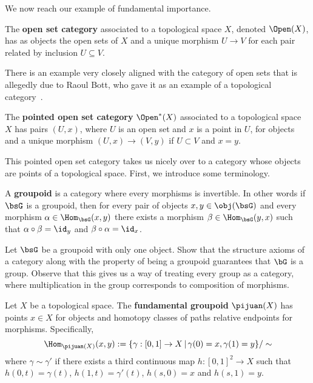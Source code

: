 We now reach our example of fundamental importance.

\begin{ex}
 The \textbf{open set category} associated to a topological space $X$, denoted $\Open(X)$, has as objects the open sets of $X$ and a unique morphism $U\to V$ for each pair related by inclusion $U\subseteq V$.
\end{ex}

 There is an example very closely aligned with the category of open sets that is allegedly due to Raoul Bott, who gave it as an example of a topological category~\cite{bott-mexico,bott-legacy}.

\begin{ex}
The \textbf{pointed open set category} $\Open^*(X)$ associated to a topological space $X$ has pairs $(U,x)$, where $U$ is an open set and $x$ is a point in $U$, for objects and a unique morphism $(U,x)\to (V,y)$ if $U\subset V$ and $x=y$.
\end{ex}

This pointed open set category takes us nicely over to a category whose objects are points of a topological space. First, we introduce some terminology.

\begin{defn}[Groupoid]\label{defn:groupoid}
A \textbf{groupoid} is a category where every morphisms is invertible. In other words if $\bsG$ is a groupoid, then for every pair of objects $x,y\in\obj(\bsG)$ and every morphism $\alpha\in\Hom_{\bsG}(x,y)$ there exists a morphism $\beta\in \Hom_{\bsG}(y,x)$ such that $\alpha\circ\beta=\id_y$ and $\beta\circ\alpha=\id_x$.
\end{defn}

\begin{exr}
Let $\bsG$ be a groupoid with only one object. Show that the structure axioms of a category along with the property of being a groupoid guarantees that $\bG$ is a group. Observe that this gives us a way of treating every group as a category, where multiplication in the group corresponds to composition of morphisms.
\end{exr}

\begin{defn}\label{defn:fundamental_groupoid}
Let $X$ be a topological space. The \textbf{fundamental groupoid} $\pijuan(X)$ has points $x\in X$ for objects and homotopy classes of paths relative endpoints for morphisms. Specifically,
\[
	\Hom_{\pijuan(X)}(x,y):=\{\gamma:[0,1]\to X\,|\,\gamma(0)=x, \gamma(1)=y\}/\sim
\]
where $\gamma\sim\gamma'$ if there exists a third continuous map $h:[0,1]^2\to X$ such that $h(0,t)=\gamma(t)$, $h(1,t)=\gamma'(t)$, $h(s,0)=x$ and $h(s,1)=y$.
\end{defn} 

